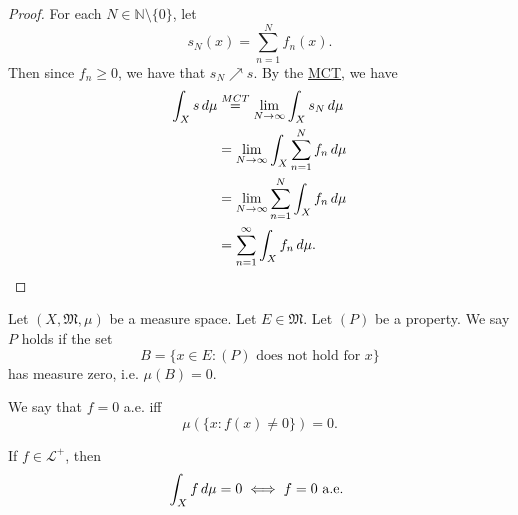 \documentclass[notoc,notitlepage]{tufte-book}
\begin{document}
\begin{proof}
  For each $N \in \mathbb{N} \setminus \{ 0 \}$, let
  \begin{equation*}
    s_N(x) = \sum_{n=1}^{N} f_n(x).
  \end{equation*}
  Then since $f_n \geq 0$, we have that $s_N \nearrow s$.
  By the \hyperref[thm:monotone_convergence_theorem]{MCT}, we have
  \begin{align*}
    \int_{X} s \mathop{}\!d{\mu}
    &\overset{MCT}{=} \lim_{N \to \infty} \int_{X} s_N \mathop{}\!d{\mu} \\
    &= \lim_{N \to \infty} \int_{X} \sum_{n=1}^{N} f_n \mathop{}\!d{\mu} \\
    &= \lim_{N \to \infty} \sum_{n=1}^{N} \int_{X} f_n \mathop{}\!d{\mu} \\
    &= \sum_{n=1}^{\infty} \int_{X} f_n \mathop{}\!d{\mu}.
  \end{align*}
\end{proof}

\begin{defn}\label{defn:almost_everywhere}
  Let $(X, \mathfrak{M}, \mu)$ be a measure space.
  Let $E \in \mathfrak{M}$. Let $(P)$ be a property.
  We say $P$ holds  if the set
  \begin{equation*}
    B = \{ x \in E : (P) \text{ does not hold for } x \}
  \end{equation*}
  has measure zero, i.e. $\mu(B) = 0$.
\end{defn}

\begin{eg}
  We say that $f = 0$ a.e. iff
  \begin{equation*}
    \mu(\{ x : f(x) \neq 0\}) = 0.
  \end{equation*}
\end{eg}

\begin{propo}\label{propo:almost_everywhere_zero_functions_have_zero_integral}
  If $f \in \mathcal{L}^+$, then
  \begin{equation*}
    \int_{X} f \mathop{}\!d{\mu} = 0 \iff f = 0 \text{ a.e. }
  \end{equation*}
\end{propo}
\end{document}
